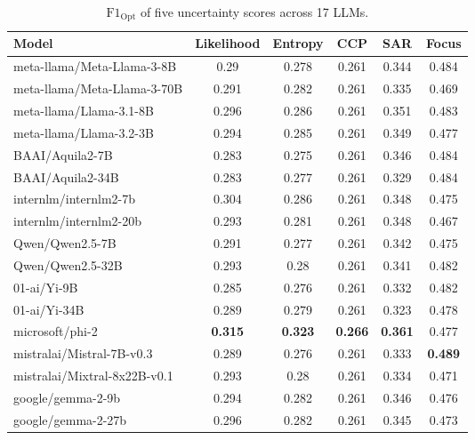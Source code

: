 \begin{table*}[t]
    \centering
    \small 
    \begin{tabular}{lccccc}
        \toprule
        Model & Likelihood & Entropy & CCP & SAR & Focus \\
\midrule
meta-llama/Meta-Llama-3-8B & 0.29 & 0.278 & 0.261 & 0.344 & 0.484 \\
meta-llama/Meta-Llama-3-70B & 0.291 & 0.282 & 0.261 & 0.335 & 0.469 \\
meta-llama/Llama-3.1-8B & 0.296 & 0.286 & 0.261 & 0.351 & 0.483 \\
meta-llama/Llama-3.2-3B & 0.294 & 0.285 & 0.261 & 0.349 & 0.477 \\
BAAI/Aquila2-7B & 0.283 & 0.275 & 0.261 & 0.346 & 0.484 \\
BAAI/Aquila2-34B & 0.283 & 0.277 & 0.261 & 0.329 & 0.484 \\
internlm/internlm2-7b & 0.304 & 0.286 & 0.261 & 0.348 & 0.475 \\
internlm/internlm2-20b & 0.293 & 0.281 & 0.261 & 0.348 & 0.467 \\
Qwen/Qwen2.5-7B & 0.291 & 0.277 & 0.261 & 0.342 & 0.475 \\
Qwen/Qwen2.5-32B & 0.293 & 0.28 & 0.261 & 0.341 & 0.482 \\
01-ai/Yi-9B & 0.285 & 0.276 & 0.261 & 0.332 & 0.482 \\
01-ai/Yi-34B & 0.289 & 0.279 & 0.261 & 0.323 & 0.478 \\
microsoft/phi-2 & \textbf{0.315} & \textbf{0.323} & \textbf{0.266} & \textbf{0.361} & 0.477 \\
mistralai/Mistral-7B-v0.3 & 0.289 & 0.276 & 0.261 & 0.333 & \textbf{0.489} \\
mistralai/Mixtral-8x22B-v0.1 & 0.293 & 0.28 & 0.261 & 0.334 & 0.471 \\
google/gemma-2-9b & 0.294 & 0.282 & 0.261 & 0.346 & 0.476 \\
google/gemma-2-27b & 0.296 & 0.282 & 0.261 & 0.345 & 0.473 \\
        \bottomrule
    \end{tabular}
    \caption{
     $\mathrm{F1}_\mathrm{Opt}$ of five uncertainty scores across 17 LLMs.
    }
    \label{tb:f1_opt_17models}
\end{table*}